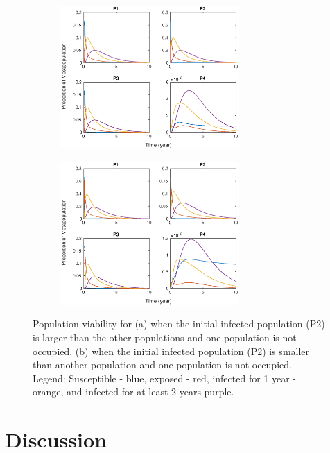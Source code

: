\documentclass[12pt]{article}
\begin{document}
\begin{figure}
    \centering
    \begin{subfigure}{\textwidth}
    \centering
    \includegraphics[width = 0.75\textwidth]{large_pop.eps}
    \caption{}
    \end{subfigure}
    \begin{subfigure}{\textwidth}
    \centering
    \includegraphics[width = 0.75\textwidth]{small_pop.eps}
    \caption{}
    \end{subfigure}
    \caption{Population viability for (a) when the initial infected population (P2) is larger than the other populations and one population is not occupied, (b) when the initial infected population (P2) is smaller than another population and one population is not occupied.  Legend: Susceptible - blue, exposed - red, infected for 1 year - orange, and infected for at least 2 years purple.}
    \label{fig:my_label}
\end{figure}


\section*{\centering \sc \large Discussion}
\end{document}
